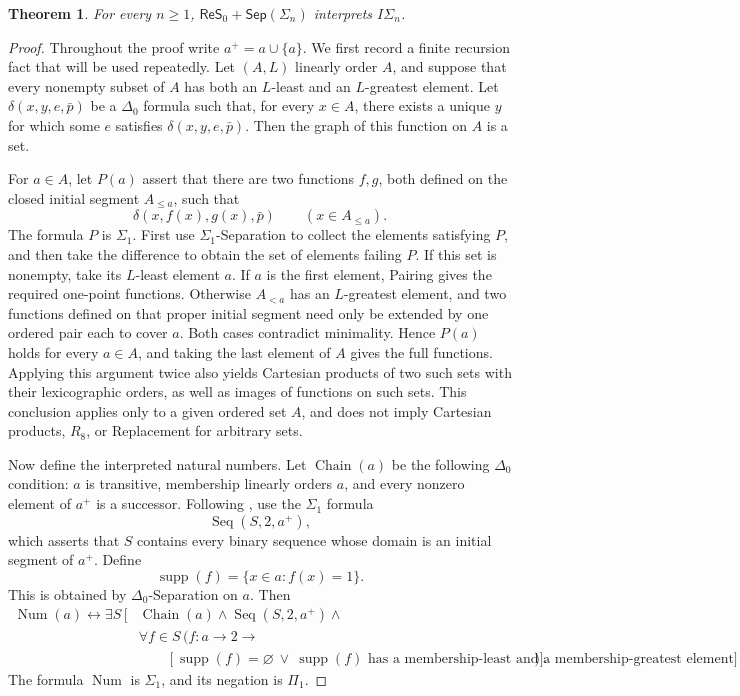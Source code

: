 \documentclass[11pt,a4paper]{article}
\newcommand{\Seq}{\operatorname{Seq}}
\newcommand{\IS}[1]{I\Sigma_{#1}}
\newcommand{\ReSzero}{\mathsf{ReS}_{0}}
\newcommand{\Sep}[1]{\mathsf{Sep}(#1)}
\theoremstyle{plain}
\newtheorem{theorem}{Theorem}[section]
\theoremstyle{definition}
\theoremstyle{remark}
\begin{document}
\begin{theorem}
  For every \(n\geq1\), \(\ReSzero+\Sep{\Sigma_n}\) interprets \(\IS{n}\).
\end{theorem}
\begin{proof}
  Throughout the proof write \(a^+=a\cup\{a\}\). We first record a finite recursion fact that will be used repeatedly. Let \((A,L)\) linearly order \(A\), and suppose that every nonempty subset of \(A\) has both an \(L\)-least and an \(L\)-greatest element. Let \(\delta(x,y,e,\bar p)\) be a \(\Delta_0\) formula such that, for every \(x\in A\), there exists a unique \(y\) for which some \(e\) satisfies \(\delta(x,y,e,\bar p)\). Then the graph of this function on \(A\) is a set.

  For \(a\in A\), let \(P(a)\) assert that there are two functions \(f,g\), both defined on the closed initial segment \(A_{\leq a}\), such that
  \[
    \delta(x,f(x),g(x),\bar p)
    \qquad(x\in A_{\leq a}).
  \]
  The formula \(P\) is \(\Sigma_1\). First use \(\Sigma_1\)-Separation to collect the elements satisfying \(P\), and then take the difference to obtain the set of elements failing \(P\). If this set is nonempty, take its \(L\)-least element \(a\). If \(a\) is the first element, Pairing gives the required one-point functions. Otherwise \(A_{<a}\) has an \(L\)-greatest element, and two functions defined on that proper initial segment need only be extended by one ordered pair each to cover \(a\). Both cases contradict minimality. Hence \(P(a)\) holds for every \(a\in A\), and taking the last element of \(A\) gives the full functions. Applying this argument twice also yields Cartesian products of two such sets with their lexicographic orders, as well as images of functions on such sets. This conclusion applies only to a given ordered set \(A\), and does not imply Cartesian products, \(R_8\), or Replacement for arbitrary sets.

  Now define the interpreted natural numbers. Let \(\operatorname{Chain}(a)\) be the following \(\Delta_0\) condition: \(a\) is transitive, membership linearly orders \(a\), and every nonzero element of \(a^+\) is a successor. Following \citet[Section 10]{Mathias2006}, use the \(\Sigma_1\) formula
  \[
    \Seq(S,2,a^+),
  \]
  which asserts that \(S\) contains every binary sequence whose domain is an initial segment of \(a^+\). Define
  \[
    \operatorname{supp}(f)=\{x\in a:f(x)=1\}.
  \]
  This is obtained by \(\Delta_0\)-Separation on \(a\). Then
  \[
  \begin{aligned}
    \operatorname{Num}(a)\longleftrightarrow\exists S\,[{}&
    \operatorname{Chain}(a)\wedge\Seq(S,2,a^+)\wedge{}\\
    &\forall f\in S\,(f\colon a\to2\longrightarrow\\
    &\qquad[\operatorname{supp}(f)=\varnothing\ \vee\
    \operatorname{supp}(f)
    \text{ has a membership-least and a membership-greatest element}])].
  \end{aligned}
  \]
  The formula \(\operatorname{Num}\) is \(\Sigma_1\), and its negation is \(\Pi_1\).


\end{proof}
\end{document}

